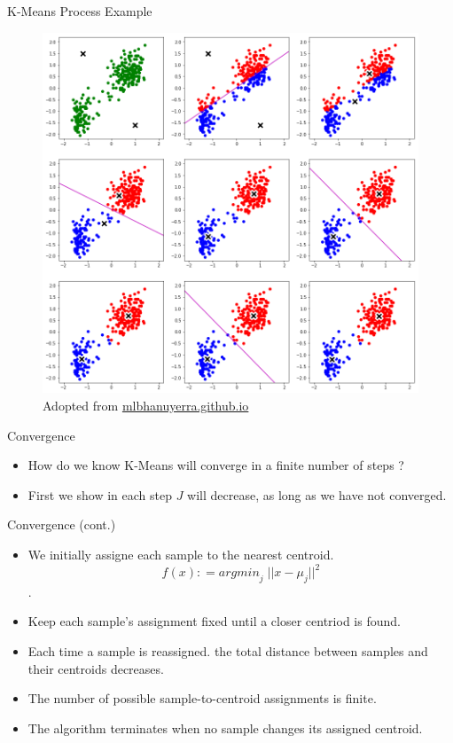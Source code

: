 \documentclass[serif, aspectratio=169]{beamer}
\begin{document}
\begin{frame}{K-Means Process Example}

\begin{figure}
        \centering
        \includegraphics[width=\textwidth]{pic/figs/Clustering_K-means_7_1.png}
        {\scriptsize Adopted from \href{https://mlbhanuyerra.github.io/2018-02-19-Clustering-K-means/}{mlbhanuyerra.github.io}}
    \end{figure}
\end{frame}


\begin{frame}{Convergence}
    \begin{itemize}
    \item How do we know K-Means will converge in a finite number of steps ?
    \item First we show in each step $J$ will decrease, as long as we have not converged.
    \end{itemize}
\end{frame}

\begin{frame}{Convergence (cont.)}
\begin{itemize}
\item We initially assigne each sample to the nearest centroid.
$$ f(x) : = \textit{argmin}_j \; ||x - \mu_j||^2 $$.

\item Keep each sample's assignment fixed until a closer centriod is found.
\item Each time a sample is reassigned. the total distance between samples and their centroids decreases.
\item The number of possible sample-to-centroid assignments is finite.

\item The algorithm terminates when no sample changes its assigned centroid.
            
\end{itemize}
    
\end{frame}
\end{document}
